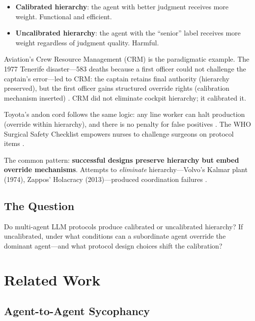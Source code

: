 \documentclass[11pt]{article}
\theoremstyle{definition}
\begin{document}
\begin{itemize}[nosep]
    \item \textbf{Calibrated hierarchy}: the agent with better judgment receives more weight. Functional and efficient.
    \item \textbf{Uncalibrated hierarchy}: the agent with the ``senior'' label receives more weight regardless of judgment quality. Harmful.
\end{itemize}

Aviation's Crew Resource Management (CRM) is the paradigmatic example. The 1977 Tenerife disaster---583 deaths because a first officer could not challenge the captain's error---led to CRM: the captain retains final authority (hierarchy preserved), but the first officer gains structured override rights (calibration mechanism inserted) \citep{helmreich1999crm}. CRM did not eliminate cockpit hierarchy; it calibrated it.

Toyota's andon cord follows the same logic: any line worker can halt production (override within hierarchy), and there is no penalty for false positives \citep{liker2004toyota}. The WHO Surgical Safety Checklist empowers nurses to challenge surgeons on protocol items \citep{haynes2009surgical}.

The common pattern: \textbf{successful designs preserve hierarchy but embed override mechanisms}. Attempts to \emph{eliminate} hierarchy---Volvo's Kalmar plant (1974), Zappos' Holacracy (2013)---produced coordination failures \citep{berggren1992volvo}.

\subsection{The Question}

Do multi-agent LLM protocols produce calibrated or uncalibrated hierarchy? If uncalibrated, under what conditions can a subordinate agent override the dominant agent---and what protocol design choices shift the calibration?

\section{Related Work}
\label{sec:related}

\subsection{Agent-to-Agent Sycophancy}
\end{document}
